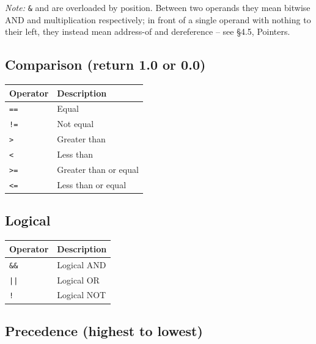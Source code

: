 \documentclass[11pt, a4paper]{article}
\newcommand{\code}[1]{\texttt{\small #1}}
\begin{document}
\textit{Note:} \code{\&} and \code{*} are overloaded by position. Between two operands they mean bitwise AND and multiplication respectively; in front of a single operand with nothing to their left, they instead mean address-of and dereference -- see \S4.5, Pointers.

\subsection{Comparison (return 1.0 or 0.0)}

\begin{center}
\begin{tabular}{@{} C{3cm} L{8cm} @{}}
  \toprule
  \textbf{Operator} & \textbf{Description} \\
  \midrule
  \code{==} & Equal \\
  \code{!=} & Not equal \\
  \code{>}  & Greater than \\
  \code{<}  & Less than \\
  \code{>=} & Greater than or equal \\
  \code{<=} & Less than or equal \\
  \bottomrule
\end{tabular}
\end{center}

\subsection{Logical}

\begin{center}
\begin{tabular}{@{} C{3cm} L{8cm} @{}}
  \toprule
  \textbf{Operator} & \textbf{Description} \\
  \midrule
  \code{\&\&} & Logical AND \\
  \code{||}   & Logical OR \\
  \code{!}    & Logical NOT \\
  \bottomrule
\end{tabular}
\end{center}

\subsection{Precedence (highest to lowest)}
\end{document}
